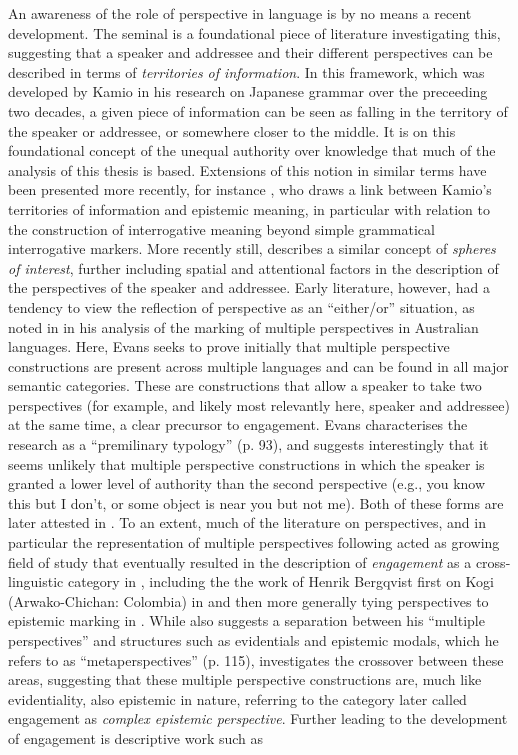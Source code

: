 An awareness of the role of perspective in language is by no means a recent development. The seminal  is a foundational piece of literature investigating this, suggesting that a speaker and addressee and their different perspectives can be described in terms of \textit{territories of information}. In this framework, which was developed by Kamio in his research on Japanese grammar over the preceeding two decades, a given piece of information can be seen as falling in the territory of the speaker or addressee, or somewhere closer to the middle. It is on this foundational concept of the unequal authority over knowledge that much of the analysis of this thesis is based. Extensions of this notion in similar terms have been presented more recently, for instance , who draws a link between Kamio's territories of information and epistemic meaning, in particular with relation to the construction of interrogative meaning beyond simple grammatical interrogative markers. More recently still,  describes a similar concept of \textit{spheres of interest}, further including spatial and attentional factors in the description of the perspectives of the speaker and addressee. Early literature, however, had a tendency to view the reflection of perspective as an ``either/or'' situation, as noted in  in his analysis of the marking of multiple perspectives in Australian languages. Here, Evans seeks to prove initially that multiple perspective constructions are present across multiple languages and can be found in all major semantic categories. These are constructions that allow a speaker to take two perspectives (for example, and likely most relevantly here, speaker and addressee) at the same time, a clear precursor to engagement. Evans characterises the research as a ``premilinary typology'' (p. 93), and suggests interestingly that it seems unlikely that multiple perspective constructions in which the speaker is granted a lower level of authority than the second perspective (e.g., you know this but I don't, or some object is near you but not me). Both of these forms are later attested in . To an extent, much of the literature on perspectives, and in particular the representation of multiple perspectives following  acted as growing field of study that eventually resulted in the description of \textit{engagement} as a cross-linguistic category in , including the the work of Henrik Bergqvist first on Kogi (Arwako-Chichan: Colombia) in  and then more generally tying perspectives to epistemic marking in . While  also suggests a separation between his ``multiple perspectives'' and structures such as evidentials and epistemic modals, which he refers to as ``metaperspectives'' (p. 115),  investigates the crossover between these areas, suggesting that these multiple perspective constructions are, much like evidentiality, also epistemic in nature, referring to the category later called engagement as \textit{complex epistemic perspective}. Further leading to the development of engagement is descriptive work such as 